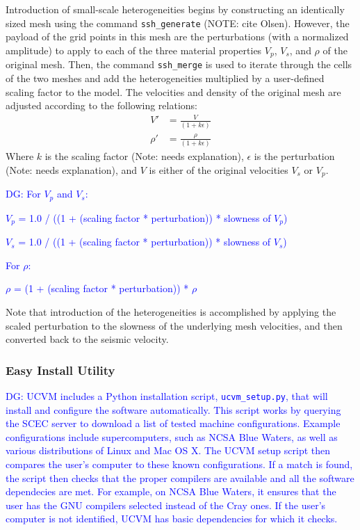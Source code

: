 Introduction of small-scale heterogeneities begins by constructing an identically sized mesh using the command \texttt{ssh\_generate} (NOTE: cite Olsen). However, the payload of the grid points in this mesh are the perturbations (with a normalized amplitude) to apply to each of the three material properties $V_p$, $V_s$, and $\rho$ of the original mesh. Then, the command \texttt{ssh\_merge} is used to iterate through the cells of the two meshes and add the heterogeneities multiplied by a user-defined scaling factor to the model. The velocities and density of the original mesh are adjusted according to the following relations:
\begin{equation}
\begin{split}
V' &= \frac{V}{(1+k\epsilon)}\\
\rho' &= \frac{\rho}{(1+k\epsilon)}
\end{split}
\end{equation}
Where $k$ is the scaling factor (Note: needs explanation), $\epsilon$ is the perturbation (Note: needs explanation), and $V$ is either of the original velocities $V_s$ or $V_p$.

\textcolor{blue}{DG: For $V_p$ and $V_s$:}

\textcolor{blue}{$V_p$ = 1.0 / ((1 + (scaling factor * perturbation)) * slowness of $V_p$)}

\textcolor{blue}{$V_s$ = 1.0 / ((1 + (scaling factor * perturbation)) * slowness of $V_s$)}

\textcolor{blue}{For $\rho$:}

\textcolor{blue}{$\rho$ = (1 + (scaling factor * perturbation)) * $\rho$}

Note that introduction of the heterogeneities is accomplished by applying the scaled perturbation to the slowness of the underlying mesh velocities, and then converted back to the seismic velocity. 

\subsubsection{Easy Install Utility}
\label{sec:easy.install}

\textcolor{blue}{DG: UCVM includes a Python installation script, \texttt{ucvm\_setup.py}, that will install and configure the software automatically. This script works by querying the SCEC server to download a list of tested machine configurations. Example configurations include supercomputers, such as NCSA Blue Waters, as well as various distributions of Linux and Mac OS X. The UCVM setup script then compares the user's computer to these known configurations. If a match is found, the script then checks that the proper compilers are available and all the software dependecies are met. For example, on NCSA Blue Waters, it ensures that the user has the GNU compilers selected instead of the Cray ones. If the user's computer is not identified, UCVM has basic dependencies for which it checks.}

